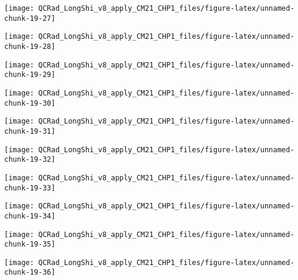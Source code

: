 \documentclass[
  10pt,
  a4paper,oneside]{article}
\begin{document}
\begin{center}\texttt{[image: QCRad\_LongShi\_v8\_apply\_CM21\_CHP1\_files/figure-latex/unnamed-chunk-19-27]} \end{center}

\begin{center}\texttt{[image: QCRad\_LongShi\_v8\_apply\_CM21\_CHP1\_files/figure-latex/unnamed-chunk-19-28]} \end{center}

\begin{center}\texttt{[image: QCRad\_LongShi\_v8\_apply\_CM21\_CHP1\_files/figure-latex/unnamed-chunk-19-29]} \end{center}

\begin{center}\texttt{[image: QCRad\_LongShi\_v8\_apply\_CM21\_CHP1\_files/figure-latex/unnamed-chunk-19-30]} \end{center}

\begin{center}\texttt{[image: QCRad\_LongShi\_v8\_apply\_CM21\_CHP1\_files/figure-latex/unnamed-chunk-19-31]} \end{center}

\begin{center}\texttt{[image: QCRad\_LongShi\_v8\_apply\_CM21\_CHP1\_files/figure-latex/unnamed-chunk-19-32]} \end{center}

\begin{center}\texttt{[image: QCRad\_LongShi\_v8\_apply\_CM21\_CHP1\_files/figure-latex/unnamed-chunk-19-33]} \end{center}

\begin{center}\texttt{[image: QCRad\_LongShi\_v8\_apply\_CM21\_CHP1\_files/figure-latex/unnamed-chunk-19-34]} \end{center}

\begin{center}\texttt{[image: QCRad\_LongShi\_v8\_apply\_CM21\_CHP1\_files/figure-latex/unnamed-chunk-19-35]} \end{center}

\begin{center}\texttt{[image: QCRad\_LongShi\_v8\_apply\_CM21\_CHP1\_files/figure-latex/unnamed-chunk-19-36]} \end{center}
\end{document}
